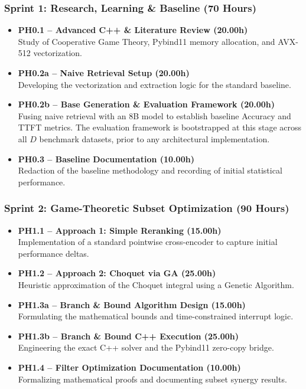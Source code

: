 \subsubsection*{Sprint 1: Research, Learning \& Baseline (70 Hours)}
\begin{itemize}[leftmargin=*, itemsep=4pt]
    \item \textbf{PH0.1 -- Advanced C++ \& Literature Review (20.00h)} \\
    Study of Cooperative Game Theory, Pybind11 memory allocation, and AVX-512 vectorization.
    \item \textbf{PH0.2a -- Naive Retrieval Setup (20.00h)} \\
    Developing the vectorization and extraction logic for the standard baseline.
    \item \textbf{PH0.2b -- Base Generation \& Evaluation Framework (20.00h)} \\
    Fusing naive retrieval with an 8B model to establish baseline 
    Accuracy and TTFT metrics. The evaluation framework is bootstrapped at this stage across all $D$ benchmark datasets, 
    prior to any architectural implementation.    \item \textbf{PH0.3 -- Baseline Documentation (10.00h)} \\
    Redaction of the baseline methodology and recording of initial statistical performance.
\end{itemize}

\subsubsection*{Sprint 2: Game-Theoretic Subset Optimization (90 Hours)}
\begin{itemize}[leftmargin=*, itemsep=4pt]
    \item \textbf{PH1.1 -- Approach 1: Simple Reranking (15.00h)} \\
    Implementation of a standard pointwise cross-encoder to capture initial performance deltas.
    \item \textbf{PH1.2 -- Approach 2: Choquet via GA (25.00h)} \\
    Heuristic approximation of the Choquet integral using a Genetic Algorithm.
    \item \textbf{PH1.3a -- Branch \& Bound Algorithm Design (15.00h)} \\
    Formulating the mathematical bounds and time-constrained interrupt logic.
    \item \textbf{PH1.3b -- Branch \& Bound C++ Execution (25.00h)} \\
    Engineering the exact C++ solver and the Pybind11 zero-copy bridge.
    \item \textbf{PH1.4 -- Filter Optimization Documentation (10.00h)} \\
    Formalizing mathematical proofs and documenting subset synergy results.
\end{itemize}

